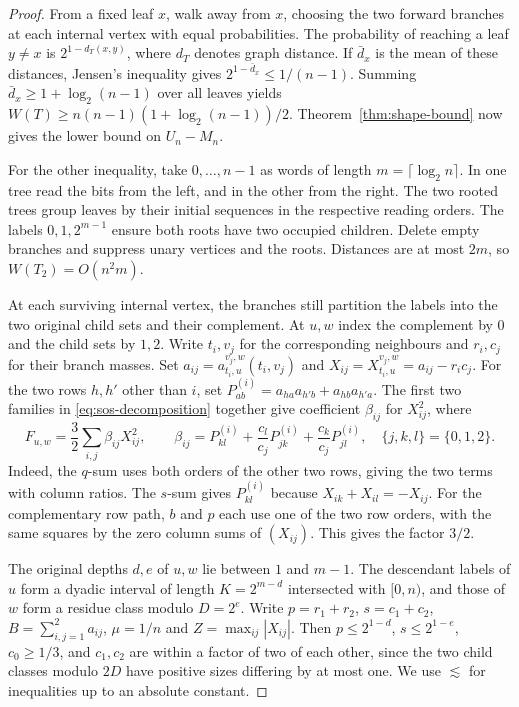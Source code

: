 \documentclass[12pt]{article}
\begin{document}
\begin{proof}
From a fixed leaf $x$, walk away from $x$, choosing the two forward
branches at each internal vertex with equal probabilities. The
probability of reaching a leaf $y\ne x$ is $2^{1-d_T(x,y)}$, where
$d_T$ denotes graph distance. If $\bar d_x$ is the mean of these
distances, Jensen's inequality gives $2^{1-\bar d_x}\le1/(n-1)$.
Summing $\bar d_x\ge1+\log_2(n-1)$ over all leaves yields
$W(T)\ge n(n-1)(1+\log_2(n-1))/2$. Theorem~\ref{thm:shape-bound}
now gives the lower bound on $U_n-M_n$.

For the other inequality, take $0,\ldots,n-1$ as words of length
$m=\lceil\log_2 n\rceil$. In one tree read the bits from the left,
and in the other from the right. The two rooted trees group leaves
by their initial sequences in the respective reading orders.
The labels $0,1,2^{m-1}$ ensure both roots have two occupied children.
Delete empty branches and suppress unary vertices and the roots.
Distances are at most $2m$, so $W(T_2)=O(n^2m)$.

At each surviving internal vertex, the branches still partition the
labels into the two original child sets and their complement. At
$u,w$ index the complement by $0$ and the child sets by $1,2$.
Write $t_i,v_j$ for the corresponding neighbours and $r_i,c_j$
for their branch masses. Set
$a_{ij}=a_{t_i,u}^{v_j,w}(t_i,v_j)$ and
$X_{ij}=X_{t_i,u}^{v_j,w}=a_{ij}-r_i c_j$. For the two rows $h,h'$ other than $i$, set
$P^{(i)}_{ab}=a_{ha}a_{h'b}+a_{hb}a_{h'a}$. The first two
families in \eqref{eq:sos-decomposition} together give coefficient
$\beta_{ij}$ for $X_{ij}^2$, where
\begin{equation}\label{eq:internal-coefficients}
 F_{u,w}=\frac32\sum_{i,j}\beta_{ij}X_{ij}^2,\qquad
 \beta_{ij}=P^{(i)}_{kl}+\frac{c_l}{c_j}P^{(i)}_{jk}
                      +\frac{c_k}{c_j}P^{(i)}_{jl},
 \quad \{j,k,l\}=\{0,1,2\}.
\end{equation}
Indeed, the $q$-sum uses both orders of the other two rows, giving
the two terms with column ratios. The $s$-sum gives $P^{(i)}_{kl}$
because $X_{ik}+X_{il}=-X_{ij}$. For the complementary row path,
$b$ and $p$ each use one of the two row orders, with the same
squares by the zero column sums of $(X_{ij})$. This gives the
factor $3/2$.

The original depths $d,e$ of $u,w$ lie between $1$ and $m-1$.
The descendant labels of $u$ form a dyadic interval of length
$K=2^{m-d}$ intersected with $[0,n)$, and those of $w$ form a
residue class modulo $D=2^e$. Write $p=r_1+r_2$, $s=c_1+c_2$,
$B=\sum_{i,j=1}^2 a_{ij}$, $\mu=1/n$ and $Z=\max_{ij}|X_{ij}|$.
Then $p\le2^{1-d}$, $s\le2^{1-e}$, $c_0\ge1/3$, and
$c_1,c_2$ are within a factor of two of each other, since the
two child classes modulo $2D$ have positive sizes differing
by at most one. We use $\lesssim$ for inequalities up to an
absolute constant.


\end{proof}
\end{document}
